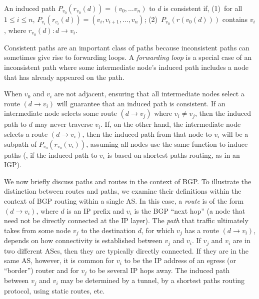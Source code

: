 \begin{defn}
An induced path $P_{v_0}(r_{v_0}(d)) = (v_0, \ldots v_n)$ to $d$ is consistent
if, (1)~for all $1 \leq i \leq n$, $P_{v_i}(r_{v_i}(d)) = (v_i, v_{i+1},
\ldots, v_n)$; (2)~$P_{v_0}(r(v_0(d)))$ contains $v_i$, where
$r_{v_0}(d): d \rightarrow v_i$.
\end{defn}

Consistent paths are an important class of paths because inconsistent
paths can sometimes give rise to forwarding loops.  A {\em forwarding
loop} is a special case of an inconsistent path where some intermediate
node's induced path includes a node that has already appeared on the
path.  

When $v_0$ and $v_i$ are not adjacent, ensuring that all intermediate
nodes select a route $(d\rightarrow v_i)$ will guarantee that an induced
path is consistent.  If an intermediate node selects some route
$(d\rightarrow v_j)$ where $v_i\neq v_j$, then the induced path to $d$
may never traverse $v_i$.  If, on
the other hand, the intermediate node selects a route $(d\rightarrow
v_i)$, then the induced path from that node to $v_i$ will be a subpath
of $P_{v_0}(r_{v_0}(v_i))$, assuming all nodes use the same function to
induce paths (\eg, if the induced path to $v_i$ is based on shortest
paths routing, as in an IGP).



We now briefly discuss paths and routes in the context of BGP.  To
illustrate the distinction between routes and paths, we examine their
definitions within the context of BGP routing within a single AS.  In
this case, a {\em route} is of the form $(d \rightarrow v_i)$, where $d$
is an IP prefix and $v_i$ is the BGP ``next hop'' (a node that need not
be directly connected at the IP layer).  The {\em path} that traffic
ultimately takes from some node $v_j$ to the destination $d$, for which
$v_j$ has a route $(d \rightarrow v_i)$, depends on how connectivity is
established between $v_j$ and $v_i$.  If $v_j$ and $v_i$ are in two
different ASes, then they are typically directly connected.  If they are
in the same AS, however, it is common for $v_i$ to be the IP address of
an egress (or ``border'') router and for $v_j$ to be several IP hops
away.  The induced path between $v_j$ and $v_i$ may be determined by a
tunnel, by a shortest paths routing protocol, using static routes, etc.

